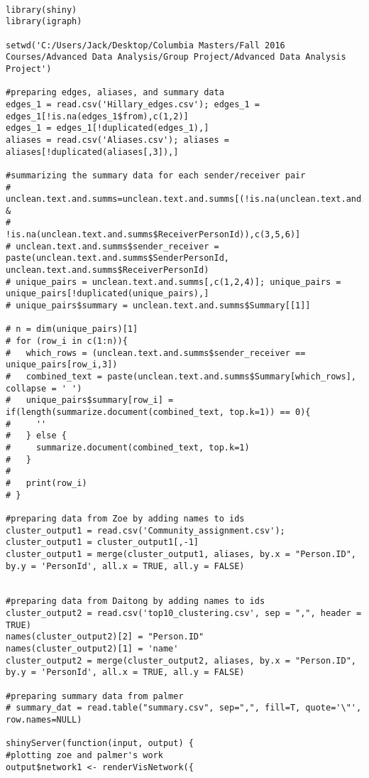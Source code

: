 \begin{verbatim}

library(shiny)
library(igraph)

setwd('C:/Users/Jack/Desktop/Columbia Masters/Fall 2016 Courses/Advanced Data Analysis/Group Project/Advanced Data Analysis Project')

#preparing edges, aliases, and summary data
edges_1 = read.csv('Hillary_edges.csv'); edges_1 = edges_1[!is.na(edges_1$from),c(1,2)]
edges_1 = edges_1[!duplicated(edges_1),]
aliases = read.csv('Aliases.csv'); aliases = aliases[!duplicated(aliases[,3]),]

#summarizing the summary data for each sender/receiver pair
# unclean.text.and.summs=unclean.text.and.summs[(!is.na(unclean.text.and.summs$SenderPersonId) & 
#                                                 !is.na(unclean.text.and.summs$ReceiverPersonId)),c(3,5,6)]
# unclean.text.and.summs$sender_receiver = paste(unclean.text.and.summs$SenderPersonId, unclean.text.and.summs$ReceiverPersonId)
# unique_pairs = unclean.text.and.summs[,c(1,2,4)]; unique_pairs = unique_pairs[!duplicated(unique_pairs),]
# unique_pairs$summary = unclean.text.and.summs$Summary[[1]]

# n = dim(unique_pairs)[1]
# for (row_i in c(1:n)){
#   which_rows = (unclean.text.and.summs$sender_receiver == unique_pairs[row_i,3])
#   combined_text = paste(unclean.text.and.summs$Summary[which_rows], collapse = ' ')
#   unique_pairs$summary[row_i] = if(length(summarize.document(combined_text, top.k=1)) == 0){
#     ''
#   } else {
#     summarize.document(combined_text, top.k=1)
#   }
# 
#   print(row_i)
# }

#preparing data from Zoe by adding names to ids
cluster_output1 = read.csv('Community_assignment.csv'); cluster_output1 = cluster_output1[,-1]
cluster_output1 = merge(cluster_output1, aliases, by.x = "Person.ID", by.y = 'PersonId', all.x = TRUE, all.y = FALSE)


#preparing data from Daitong by adding names to ids
cluster_output2 = read.csv('top10_clustering.csv', sep = ",", header = TRUE)
names(cluster_output2)[2] = "Person.ID"
names(cluster_output2)[1] = 'name'
cluster_output2 = merge(cluster_output2, aliases, by.x = "Person.ID", by.y = 'PersonId', all.x = TRUE, all.y = FALSE)

#preparing summary data from palmer
# summary_dat = read.table("summary.csv", sep=",", fill=T, quote='\"', row.names=NULL)

shinyServer(function(input, output) {
#plotting zoe and palmer's work
output$network1 <- renderVisNetwork({


\end{verbatim}
